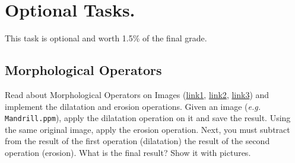 \documentclass[11pt]{article}
\begin{document}
\section*{Optional Tasks.}
\vspace{-3mm}
This task is optional and worth 1.5\% of the final grade. 

\subsection{Morphological Operators}

Read about Morphological Operators on Images (\href{https://www.cs.auckland.ac.nz/courses/compsci773s1c/lectures/ImageProcessing-html/topic4.htm}{link1}, \href{https://www.di.univr.it/documenti/OccorrenzaIns/matdid/matdid699113.pdf}{link2}, \href{https://www.researchgate.net/publication/272484795_Morphological_Operations_for_Image_Processing_Understanding_and_its_Applications}{link3}) and implement the dilatation and erosion operations.
Given an image (\textit{e.g.} \texttt{Mandrill.ppm}), apply the dilatation operation on it and save the result. Using the same original image, apply the erosion operation. Next, you must subtract from the result of the first operation (dilatation) the result of the second operation (erosion). What is the final result? Show it with pictures.

%
%
\end{document}
